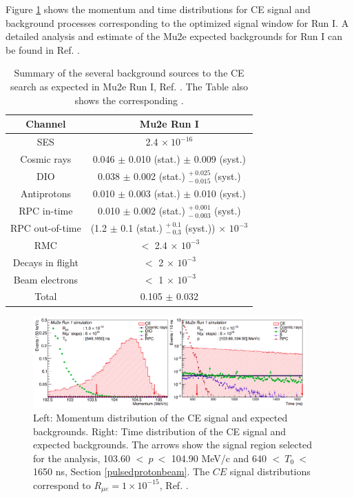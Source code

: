 Figure \ref{fig:sensitivity} shows the momentum and time distributions 
for CE signal and background processes corresponding to the optimized 
signal window for Run I. A detailed analysis and  estimate of the Mu2e 
expected backgrounds for Run I can be found in Ref. \cite{universe9010054}.
\begin{center}  
\begin{table}[!h]
\centering
\renewcommand{\arraystretch}{1.2}
\begin{tabular}{| c | c |}
\hline
\textbf{Channel} & \textbf{Mu2e Run I}\\
\hline
SES & 2.4 $\times \ 10^{-16}$ \\
\hline
Cosmic rays & 0.046 $\pm$ 0.010 (stat.) $\pm$ 0.009 (syst.) \\
DIO & 0.038 $\pm$ 0.002 (stat.) $ ^{+ \ 0.025} _{- \ 0.015}$ (syst.)\\
Antiprotons & 0.010 $\pm$ 0.003 (stat.) $\pm$ 0.010 (syst.) \\
RPC in-time & 0.010 $\pm$ 0.002 (stat.) $ ^{+ \ 0.001} _{- \ 0.003}$ (syst.)\\
RPC out-of-time & (1.2 $\pm$ 0.1  (stat.) $ ^{+ \ 0.1} _{- \ 0.3}$ (syst.)) $\times$ $10^{-3}$ \\
RMC & $<$ 2.4 $\times$ $10^{-3}$ \\
Decays in flight & $<$ 2 $\times$ $10^{-3}$ \\
Beam electrons & $<$ 1 $\times$ $10^{-3}$ \\
\hline
Total &  0.105 $\pm$ 0.032\\
\hline
\end{tabular}
\caption{Summary of the several background sources to 
the CE search as expected in Mu2e Run I,  Ref. \cite{universe9010054}. 
The Table also shows the corresponding . 
}

\label{tab:summarybkg}
\end{table}
\end{center}
\begin{figure}[!h]
\centering
\includegraphics[width =0.93\textwidth]{figures/png/Screenshot_20240225_102708.png}
\caption[Mu2e simulated signal.]{Left: Momentum distribution of the CE signal and expected backgrounds. Right: Time distribution of the CE signal and expected backgrounds. The arrows show the signal region selected for the analysis, 103.60 $< \ p \ < $ 104.90 MeV/c and 640 $< \ T_0 \ < $ 1650 ns, Section \ref{pulsedprotonbeam}. The $CE$ signal distributions correspond to $R_{\mu e} = 1 \times 10^{-15}$, Ref. \cite{universe9010054}.}
\label{fig:sensitivity}
\end{figure}

